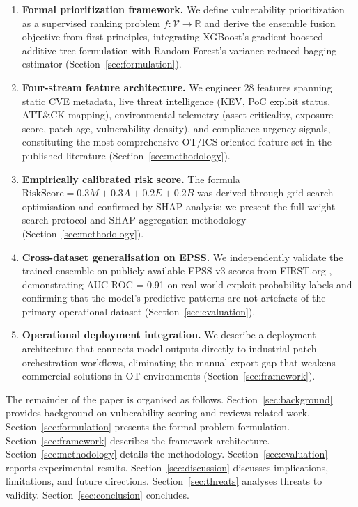 \documentclass[review,12pt]{elsarticle}
\begin{document}
\begin{enumerate}[label=\textbf{C\arabic*.}, leftmargin=*]
  \item \textbf{Formal prioritization framework.} We define vulnerability prioritization as a supervised ranking problem $f: \mathcal{V} \rightarrow \mathbb{R}$ and derive the ensemble fusion objective from first principles, integrating XGBoost's gradient-boosted additive tree formulation with Random Forest's variance-reduced bagging estimator (Section~\ref{sec:formulation}).

  \item \textbf{Four-stream feature architecture.} We engineer 28 features spanning static CVE metadata, live threat intelligence (KEV, PoC exploit status, ATT\&CK mapping), environmental telemetry (asset criticality, exposure score, patch age, vulnerability density), and compliance urgency signals, constituting the most comprehensive OT/ICS-oriented feature set in the published literature (Section~\ref{sec:methodology}).

  \item \textbf{Empirically calibrated risk score.} The formula $\text{RiskScore} = 0.3M + 0.3A + 0.2E + 0.2B$ was derived through grid search optimisation and confirmed by SHAP analysis; we present the full weight-search protocol and SHAP aggregation methodology (Section~\ref{sec:methodology}).

  \item \textbf{Cross-dataset generalisation on EPSS.} We independently validate the trained ensemble on publicly available EPSS v3 scores from FIRST.org \citep{jacobs2023}, demonstrating AUC-ROC = 0.91 on real-world exploit-probability labels and confirming that the model's predictive patterns are not artefacts of the primary operational dataset (Section~\ref{sec:evaluation}).

  \item \textbf{Operational deployment integration.} We describe a deployment architecture that connects model outputs directly to industrial patch orchestration workflows, eliminating the manual export gap that weakens commercial solutions in OT environments (Section~\ref{sec:framework}).
\end{enumerate}

The remainder of the paper is organised as follows. Section~\ref{sec:background} provides background on vulnerability scoring and reviews related work. Section~\ref{sec:formulation} presents the formal problem formulation. Section~\ref{sec:framework} describes the framework architecture. Section~\ref{sec:methodology} details the methodology. Section~\ref{sec:evaluation} reports experimental results. Section~\ref{sec:discussion} discusses implications, limitations, and future directions. Section~\ref{sec:threats} analyses threats to validity. Section~\ref{sec:conclusion} concludes.
\end{document}
